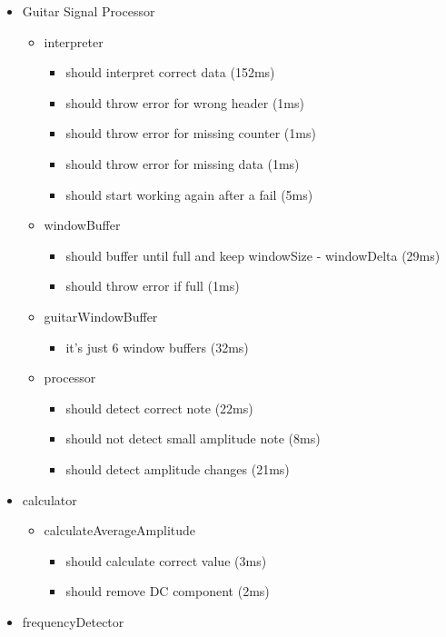 \begin{itemize}
	\item Guitar Signal Processor
	\begin{itemize}
		\item interpreter
		\begin{itemize}
      \item should interpret correct data (152ms)
      \item should throw error for wrong header (1ms)
      \item should throw error for missing counter (1ms)
      \item should throw error for missing data (1ms)
			\item should start working again after a fail (5ms)
	  \end{itemize}
	  \item windowBuffer
	  \begin{itemize}
      \item should buffer until full and keep windowSize - windowDelta (29ms)
		  \item should throw error if full (1ms)
		\end{itemize}
		\item guitarWindowBuffer
		\begin{itemize}
		  \item it's just 6 window buffers (32ms)
		\end{itemize}
		\item processor
		\begin{itemize}
      \item should detect correct note (22ms)
      \item should not detect small amplitude note (8ms)
      \item should detect amplitude changes (21ms)
		\end{itemize}
	\end{itemize}
	\item calculator
	\begin{itemize}
		\item calculateAverageAmplitude
		\begin{itemize}
			\item should calculate correct value (3ms)
			\item should remove DC component (2ms)
		\end{itemize}
	\end{itemize}
	\item frequencyDetector
	\begin{itemize}

\end{itemize}
\end{itemize}
